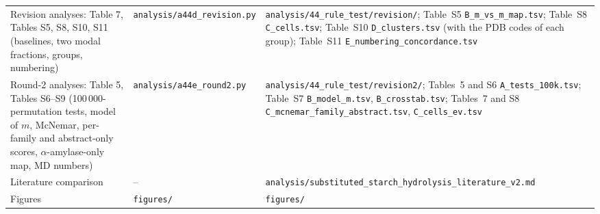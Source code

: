 \documentclass[preprint,12pt]{elsarticle}
\begin{document}
\begin{table}[h]
\begin{tabular}{>{\raggedright\arraybackslash}p{3.3cm}>{\raggedright\arraybackslash}p{3.5cm}>{\raggedright\arraybackslash}p{4.9cm}}
Revision analyses: Table 7, Tables S5, S8, S10, S11 (baselines, two modal fractions, groups, numbering) & \texttt{analysis/a44d\_revision.py} & \texttt{analysis/44\_rule\_test/revision/}; Table~S5 \texttt{B\_m\_vs\_m\_map.tsv}; Table~S8 \texttt{C\_cells.tsv}; Table~S10 \texttt{D\_clusters.tsv} (with the PDB codes of each group); Table~S11 \texttt{E\_numbering\_}\allowbreak\texttt{concordance.tsv} \\
Round-2 analyses: Table 5, Tables S6--S9 (100\,000-permutation tests, model of $m$, McNemar, per-family and abstract-only scores, $\alpha$-amylase-only map, MD numbers) & \texttt{analysis/a44e\_round2.py} & \texttt{analysis/44\_rule\_test/revision2/}; Tables~5 and S6 \texttt{A\_tests\_100k.tsv}; Table~S7 \texttt{B\_model\_m.tsv}, \texttt{B\_crosstab.tsv}; Tables~7 and S8 \texttt{C\_mcnemar\_family\_}\allowbreak\texttt{abstract.tsv}, \texttt{C\_cells\_ev.tsv} \\
Literature comparison & -- & \texttt{analysis/substituted\_starch\_}\allowbreak\texttt{hydrolysis\_literature\_v2.md} \\
Figures & \texttt{figures/} & \texttt{figures/} \\
\bottomrule
\end{tabular}
\end{table}



\end{document}
